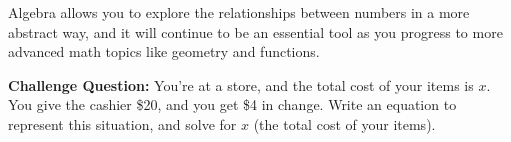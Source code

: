 Algebra allows you to explore the relationships between numbers in a more abstract way, and it will continue to be an essential tool as you progress to more advanced math topics like geometry and functions.

\textbf{Challenge Question:}
You’re at a store, and the total cost of your items is $x$. You give the cashier \$20, and you get \$4 in change. Write an equation to represent this situation, and solve for $x$ (the total cost of your items).